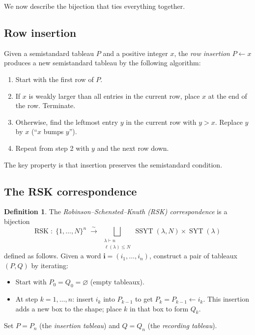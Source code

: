 \documentclass[12pt,a4paper]{article}
\theoremstyle{definition}
\newtheorem{definition}[theorem]{Definition}
\theoremstyle{remark}
\newcommand{\SYT}{\operatorname{SYT}}
\newcommand{\SSYT}{\operatorname{SSYT}}
\begin{document}
We now describe the bijection that ties everything together.

\subsection{Row insertion}

Given a semistandard tableau $P$ and a positive integer $x$, the
\emph{row insertion} $P \leftarrow x$ produces a new semistandard
tableau by the following algorithm:

\begin{enumerate}
\item Start with the first row of $P$.
\item If $x$ is weakly larger than all entries in the current row,
  place $x$ at the end of the row. Terminate.
\item Otherwise, find the leftmost entry $y$ in the current row with
  $y > x$. Replace $y$ by $x$ (``$x$ bumps $y$'').
\item Repeat from step 2 with $y$ and the next row down.
\end{enumerate}

The key property is that insertion preserves the semistandard
condition.

\subsection{The RSK correspondence}

\begin{definition}
The \emph{Robinson--Schensted--Knuth (RSK) correspondence} is a
bijection
\[
  \mathrm{RSK} \;:\; \{1, \ldots, N\}^n
  \;\xrightarrow{\;\sim\;}\;
  \bigsqcup_{\substack{\lambda \vdash n \\ \ell(\lambda) \leqslant N}}
  \SSYT(\lambda, N) \times \SYT(\lambda)
\]
defined as follows. Given a word $\mathbf{i} = (i_1, \ldots, i_n)$,
construct a pair of tableaux $(P, Q)$ by iterating:
\begin{itemize}
\item Start with $P_0 = Q_0 = \varnothing$ (empty tableaux).
\item At step $k = 1, \ldots, n$: insert $i_k$ into $P_{k-1}$ to get
  $P_k = P_{k-1} \leftarrow i_k$. This insertion adds a new box to
  the shape; place $k$ in that box to form $Q_k$.
\end{itemize}
Set $P = P_n$ (the \emph{insertion tableau}) and $Q = Q_n$ (the
\emph{recording tableau}).
\end{definition}
\end{document}
